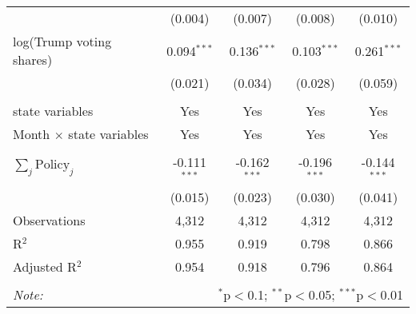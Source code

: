 \begin{tabular}{@{\extracolsep{1pt}}lcccc}
  & (0.004) & (0.007) & (0.008) & (0.010) \\ 
  log(Trump voting shares) & 0.094$^{***}$ & 0.136$^{***}$ & 0.103$^{***}$ & 0.261$^{***}$ \\ 
  & (0.021) & (0.034) & (0.028) & (0.059) \\ 
 \hline \\[-1.8ex] 
state variables & Yes & Yes & Yes & Yes \\ 
Month $\times$ state variables & Yes & Yes & Yes & Yes \\ 
\hline \\[-1.8ex] 
$\sum_j \mathrm{Policy}_j$ & -0.111$^{***}$ & -0.162$^{***}$ & -0.196$^{***}$ & -0.144$^{***}$ \\ 
 & (0.015) & (0.023) & (0.030) & (0.041) \\ 
Observations & 4,312 & 4,312 & 4,312 & 4,312 \\ 
R$^{2}$ & 0.955 & 0.919 & 0.798 & 0.866 \\ 
Adjusted R$^{2}$ & 0.954 & 0.918 & 0.796 & 0.864 \\ 
\hline 
\hline \\[-1.8ex] 
\textit{Note:}  & \multicolumn{4}{r}{$^{*}$p$<$0.1; $^{**}$p$<$0.05; $^{***}$p$<$0.01} \\ 
\end{tabular} 